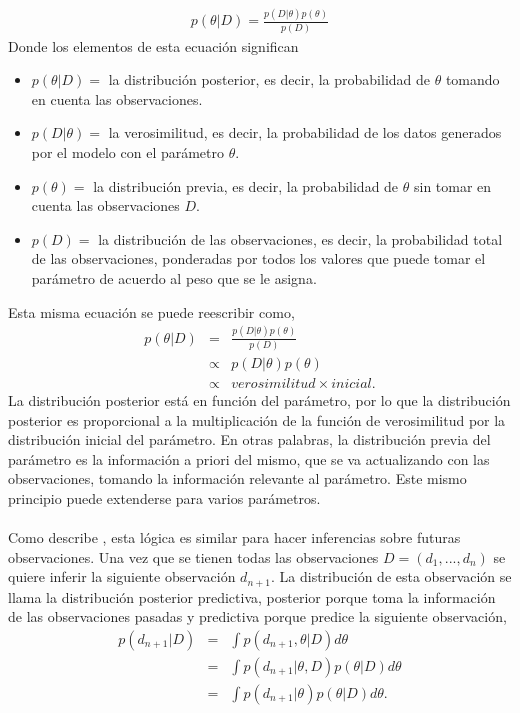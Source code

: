 \begin{align*}
p(\theta|D)=\frac{p(D|\theta)p(\theta)}{p(D)}
\end{align*}
Donde los elementos de esta ecuaci\'on significan
\begin{itemize}
\item $p(\theta|D)=$ la distribuci\'on posterior, es decir, la probabilidad de $\theta$ tomando en cuenta las observaciones.
\item $p(D|\theta)=$ la verosimilitud, es decir, la probabilidad de los datos generados por el modelo con el par\'ametro $\theta$.
\item $p(\theta)=$ la distribuci\'on previa, es decir, la probabilidad de $\theta$ sin tomar en cuenta las observaciones $D$.
\item $p(D)=$ la distribuci\'on de las observaciones, es decir, la probabilidad total de las observaciones, ponderadas por todos los valores que puede tomar el par\'ametro de acuerdo al peso que se le asigna.
\end{itemize}
Esta misma ecuaci\'on se puede reescribir como,
\begin{eqnarray*}
p(\theta|D)&=&\frac{p(D|\theta)p(\theta)}{p(D)}\\
		   &\propto & p(D|\theta)p(\theta)\\
		   &\propto & verosimilitud \times inicial.
\end{eqnarray*}
La distribuci\'on posterior est\'a en funci\'on del par\'ametro, por lo que la distribuci\'on posterior es proporcional a la multiplicaci\'on de la funci\'on de verosimilitud por la distribuci\'on inicial del par\'ametro. En otras palabras, la distribuci\'on previa del par\'ametro es la informaci\'on a priori del mismo, que se va actualizando con las observaciones, tomando la informaci\'on relevante al par\'ametro. Este mismo principio puede extenderse para varios par\'ametros.\\
\\
Como describe \cite{gelman2014bayesian}, esta l\'ogica es similar para hacer inferencias sobre futuras observaciones. Una vez que se tienen todas las observaciones $D=(d_1,...,d_n)$ se quiere inferir la siguiente observaci\'on $d_{n+1}$. La distribuci\'on de esta observaci\'on se llama la distribuci\'on posterior predictiva, posterior porque toma la informaci\'on de las observaciones pasadas y predictiva porque predice la siguiente observaci\'on,
\begin{eqnarray*}
p(d_{n+1}|D)&=&\int p(d_{n+1},\theta|D) d\theta \\
			&=& \int p(d_{n+1}|\theta,D)p(\theta|D)d\theta \\
			&=& \int p(d_{n+1}|\theta)p(\theta|D)d\theta.
\end{eqnarray*}
